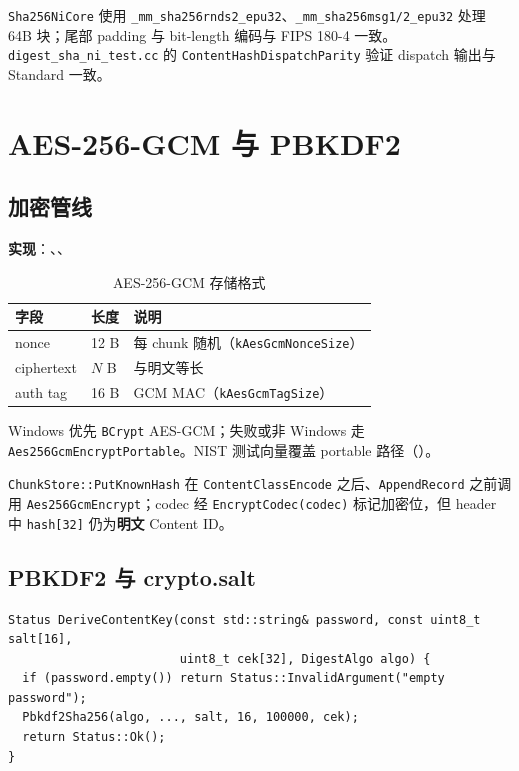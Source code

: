 \texttt{Sha256NiCore} 使用 \texttt{\_mm\_sha256rnds2\_epu32}、\texttt{\_mm\_sha256msg1/2\_epu32} 处理 64B 块；尾部 padding 与 bit-length 编码与 FIPS 180-4 一致。\texttt{digest\_sha\_ni\_test.cc} 的 \texttt{ContentHashDispatchParity} 验证 dispatch 输出与 Standard 一致。

\section{AES-256-GCM 与 PBKDF2}

\subsection{加密管线}

\textbf{实现}：、、

\begin{table}[htbp]
\centering
\caption{AES-256-GCM 存储格式}
\begin{tabular}{@{}lll@{}}
\toprule
字段 & 长度 & 说明 \\
\midrule
nonce & 12 B & 每 chunk 随机（\texttt{kAesGcmNonceSize}） \\
ciphertext & $N$ B & 与明文等长 \\
auth tag & 16 B & GCM MAC（\texttt{kAesGcmTagSize}） \\
\bottomrule
\end{tabular}
\end{table}

Windows 优先 \texttt{BCrypt} AES-GCM；失败或非 Windows 走 \texttt{Aes256GcmEncryptPortable}。NIST 测试向量覆盖 portable 路径（）。

\texttt{ChunkStore::PutKnownHash} 在 \texttt{ContentClassEncode} 之后、\texttt{AppendRecord} 之前调用 \texttt{Aes256GcmEncrypt}；codec 经 \texttt{EncryptCodec(codec)} 标记加密位，但 header 中 \texttt{hash[32]} 仍为\textbf{明文} Content ID。

\subsection{PBKDF2 与 crypto.salt}

\begin{lstlisting}[caption={DeriveContentKey（\filepath{aes\_gcm.cc}）},label={lst:derive-cek}]
Status DeriveContentKey(const std::string& password, const uint8_t salt[16],
                        uint8_t cek[32], DigestAlgo algo) {
  if (password.empty()) return Status::InvalidArgument("empty password");
  Pbkdf2Sha256(algo, ..., salt, 16, 100000, cek);
  return Status::Ok();
}
\end{lstlisting}

